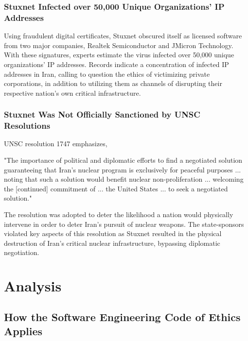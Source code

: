 \documentclass[12pt]{article}
\begin{document}
\begin{multicols}{2}
\subsubsection{Stuxnet Infected over 50,000 Unique Organizations' IP Addresses}

Using fraudulent digital certificates, Stuxnet obscured itself as licensed software from two major companies, Realtek Semiconductor and JMicron Technology. With these signatures, experts estimate the virus infected over 50,000 unique organizations' IP addresses.\cite{lessonsFromStuxnet} Records indicate a concentration of infected IP addresses in Iran, calling to question the ethics of victimizing private corporations, in addition to utilizing them as channels of disrupting their respective nation's own critical infrastructure.\cite{w32.stuxnetDossier} 

\subsubsection{Stuxnet Was Not Officially Sanctioned by UNSC Resolutions}

UNSC resolution 1747 emphasizes,

\begin{displayquote}
"The importance of political and diplomatic efforts to find a negotiated solution guaranteeing that Iran's nuclear program is exclusively for peaceful purposes ... noting that such a solution would benefit nuclear non-proliferation ... welcoming the [continued] commitment of ... the United States ... to seek a negotiated solution."\cite{resolution1747}
\end{displayquote}

The resolution was adopted to deter the likelihood a nation would physically intervene in order to deter Iran's pursuit of nuclear weapons. The state-sponsors violated key aspects of this resolution as Stuxnet resulted in the physical destruction of Iran's critical nuclear infrastructure, bypassing diplomatic negotiation.


\section{Analysis}

\subsection{How the Software Engineering Code of Ethics Applies}


\end{multicols}
\end{document}
